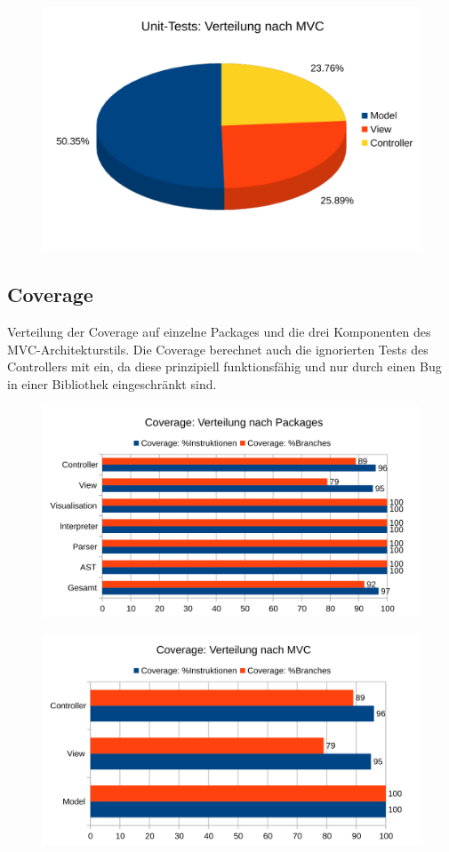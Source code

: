 \documentclass[parskip=full,11pt,twoside]{scrartcl}
\begin{document}
\begin{figure}[!h]
	\centering
	\includegraphics[width=0.7\linewidth]{images/tests_mvc.png}
\end{figure}

\subsection{Coverage}
Verteilung der Coverage auf einzelne Packages und die drei Komponenten des MVC-Architekturstils. Die Coverage berechnet auch die ignorierten Tests des Controllers mit ein, da diese prinzipiell funktionsfähig und nur durch einen Bug in einer Bibliothek eingeschränkt sind.

\begin{figure}[!h]
	\centering
	\includegraphics[width=\linewidth]{images/coverage_packages.png}
\end{figure}

\begin{figure}[!h]
	\centering
	\includegraphics[width=\linewidth]{images/coverage_mvc.png}
\end{figure}
\end{document}
